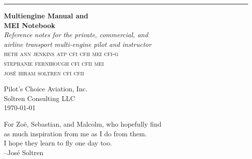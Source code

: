 \documentclass[11pt,twoside,letterpaper,onecolumn]{book}
\newenvironment{dedication}
  {\clearpage           %
   \thispagestyle{empty}%
   \vspace*{\stretch{1}}%
   \itshape             %
   \raggedleft          %
  }
  {\par %
   \vspace{\stretch{3}} %
   \clearpage           %
  }
\begin{document}
\begin{titlepage} %
\raggedleft %
\rule{1pt}{\textheight} %
\hspace{0.05\textwidth} %
\parbox[b]{0.75\textwidth}{ %
{\Huge\bfseries Multiengine Manual and\\MEI Notebook}\\[2\baselineskip] %
{\large\textit{Reference notes for the private, commercial, and \\
    airline transport multi-engine pilot and instructor}}\\[4\baselineskip] %
{\Large\textsc{beth ann jenkins atp cfi cfii mei cfi-g\\}} %
{\Large\textsc{stephanie fernihough cfi cfii mei\\}} %
{\Large\textsc{jos\'e hiram soltren cfi cfii}} %

\vspace{0.5\textheight} %

{\noindent Pilot's Choice Aviation, Inc.\\Soltren Consulting LLC}\\[\baselineskip] %
{\noindent \today }\\[\baselineskip] %
}

\end{titlepage}

\begin{dedication}
For Zo\"e, Sebastian, and Malcolm, who hopefully find\\
as much inspiration from me as I do from them.\\
I hope they learn to fly one day too.\\
--Jos\'e Soltren
\end{dedication}

\pagestyle{fancy}

\fancyhead{} %
\fancyfoot{} %
\fancyfoot[LE,RO]{\thepage}
\fancyfoot[LO,CE]{}
\fancyfoot[CO,RE]{}



%
%

\tableofcontents



\printbibliography
\end{document}
